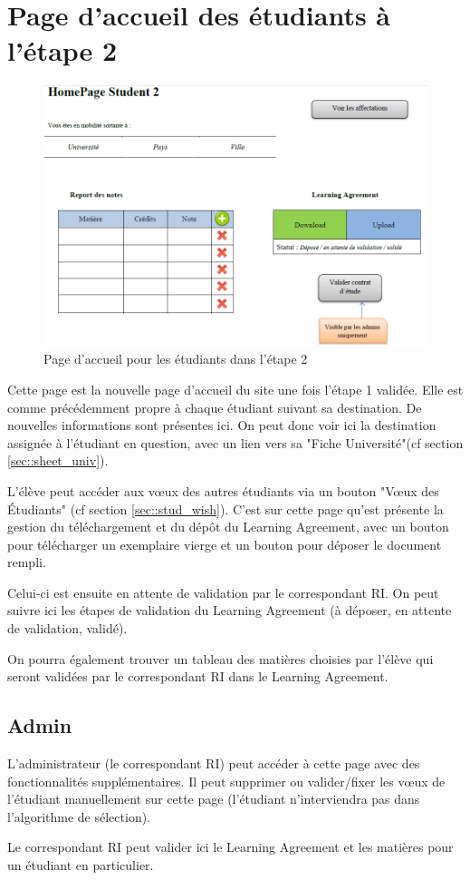 \section{Page d'accueil des étudiants à l'étape 2}



\begin{figure}[H]
	\includegraphics[scale=0.6]{Etudiant/HPS2.PNG}
	\caption{Page d'accueil pour les étudiants dans l'étape 2}
\end{figure}


Cette page est la nouvelle page d'accueil du site une fois l'étape 1 validée.
Elle est comme précédemment propre à chaque étudiant suivant sa destination. De nouvelles informations sont présentes ici.
On peut donc voir ici la destination assignée à l'étudiant en question, avec un lien vers sa "Fiche Université"(cf section \ref{sec::sheet_univ}).

L'élève peut accéder aux vœux des autres étudiants via un bouton "Vœux des Étudiants" (cf section \ref{sec::stud_wish}).
C'est sur cette page qu'est présente la gestion du téléchargement et du dépôt du Learning Agreement, avec un bouton pour télécharger un exemplaire vierge et un bouton pour déposer le document rempli.

Celui-ci est ensuite en attente de validation par le correspondant RI. On peut suivre ici les étapes de validation du Learning Agreement (à déposer, en attente de validation, validé).


\bigbreak

On pourra également trouver un tableau des matières choisies par l'élève qui seront validées par le correspondant RI dans le Learning Agreement.

\subsection{Admin}

L'administrateur (le correspondant RI) peut accéder à cette page avec des fonctionnalités supplémentaires.
Il peut supprimer ou valider/fixer les vœux de l'étudiant manuellement sur cette page (l'étudiant n'interviendra pas dans l'algorithme de sélection).

Le correspondant RI peut valider ici le Learning Agreement et les matières pour un étudiant en particulier.
